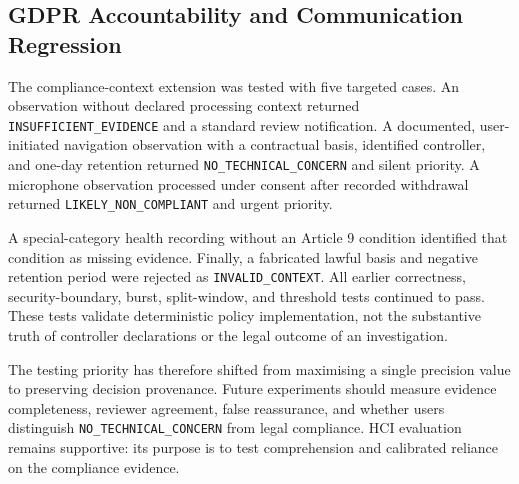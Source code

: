
\subsection{GDPR Accountability and Communication Regression}

The compliance-context extension was tested with five targeted cases. An observation without declared processing context returned \texttt{INSUFFICIENT\_EVIDENCE} and a standard review notification. A documented, user-initiated navigation observation with a contractual basis, identified controller, and one-day retention returned \texttt{NO\_TECHNICAL\_CONCERN} and silent priority. A microphone observation processed under consent after recorded withdrawal returned \texttt{LIKELY\_NON\_COMPLIANT} and urgent priority.

A special-category health recording without an Article 9 condition identified that condition as missing evidence. Finally, a fabricated lawful basis and negative retention period were rejected as \texttt{INVALID\_CONTEXT}. All earlier correctness, security-boundary, burst, split-window, and threshold tests continued to pass. These tests validate deterministic policy implementation, not the substantive truth of controller declarations or the legal outcome of an investigation.

The testing priority has therefore shifted from maximising a single precision value to preserving decision provenance. Future experiments should measure evidence completeness, reviewer agreement, false reassurance, and whether users distinguish \texttt{NO\_TECHNICAL\_CONCERN} from legal compliance. HCI evaluation remains supportive: its purpose is to test comprehension and calibrated reliance on the compliance evidence.
